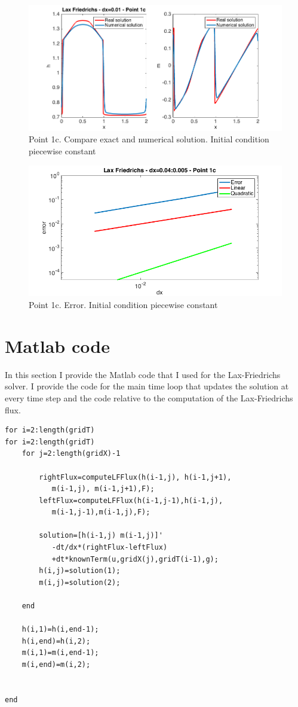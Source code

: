 \documentclass[oneside,12pt]{book}  %
\theoremstyle{plain}
\theoremstyle{definition}
\theoremstyle{remark}
\numberwithin{equation}{chapter} %
\begin{document}
\begin{figure}[h]
\label{img:lf_1c_3_solution}
\centering
\includegraphics[scale=0.5]{Immagini/LF/1c-3-solution.png}
\caption{Point 1c. Compare exact and numerical solution. Initial
  condition piecewise constant}
\end{figure}

\begin{figure}[h]
\label{img:lf_1c_3_error}
\centering
\includegraphics[scale=0.5]{Immagini/LF/1c-3-error.png}
\caption{Point 1c. Error. Initial condition piecewise constant}
\end{figure}

\FloatBarrier
\section{Matlab code}
In this section I provide the Matlab code that I used for the
Lax-Friedrichs solver. I provide the code for the main time loop that
updates the solution at every time step and the code relative to the
computation of the Lax-Friedrichs flux.
\begin{lstlisting}[frame=single]for i=2:length(gridT)
for i=2:length(gridT)
    for j=2:length(gridX)-1
        
        rightFlux=computeLFFlux(h(i-1,j), h(i-1,j+1),
           m(i-1,j), m(i-1,j+1),F);
        leftFlux=computeLFFlux(h(i-1,j-1),h(i-1,j),
           m(i-1,j-1),m(i-1,j),F);

        solution=[h(i-1,j) m(i-1,j)]'
           -dt/dx*(rightFlux-leftFlux)
           +dt*knownTerm(u,gridX(j),gridT(i-1),g);
        h(i,j)=solution(1);
        m(i,j)=solution(2);
        
    end
    
    h(i,1)=h(i,end-1);
    h(i,end)=h(i,2);
    m(i,1)=m(i,end-1);
    m(i,end)=m(i,2);
    
    
end
\end{lstlisting}
\end{document}
